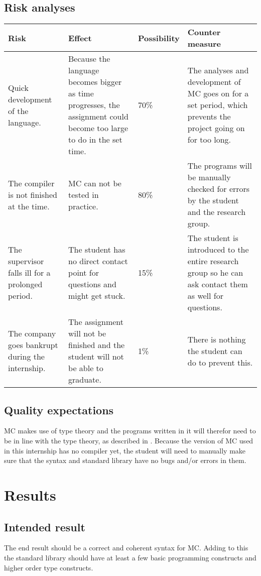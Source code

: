 \subsection{Risk analyses}
\begin{center}
   \begin{tabular}
      {| p{} | p{} | l | p{} |}
      \hline
      \textbf{Risk} & \textbf{Effect} & \textbf{Possibility} & \textbf{Counter measure}
      \\ \hline
      Quick development of the language. & Because the language becomes bigger as time progresses, the assignment could become too large to do in the set time. & 70\% & The analyses and development of MC goes on for a set period, which prevents the project going on for too long.
      \\ \hline
      The compiler is not finished at the time. & MC can not be tested in practice. & 80\% & The programs will be manually checked for errors by the student and the research group.
      \\ \hline
      The supervisor falls ill for a prolonged period. & The student has no direct contact point for questions and might get stuck. & 15\% & The student is introduced to the entire research group so he can ask contact them as well for questions.
      \\ \hline
      The company goes bankrupt during the internship. & The assignment will not be finished and the student will not be able to graduate. & 1\% & There is nothing the student can do to prevent this.
      \\ \hline
   \end{tabular}
\end{center}

\subsection{Quality expectations}
MC makes use of type theory and the programs written in it will therefor need to be in line with the type theory, as described in \cite{pierce2002types}.
Because the version of MC used in this internship has no compiler yet, the student will need to manually make sure that the syntax and standard library have no bugs and/or errors in them.

\section{Results}
\subsection{Intended result}
The end result should be a correct and coherent syntax for MC.
Adding to this the standard library should have at least a few basic programming constructs and higher order type constructs.





\begin{appendices}
   
\end{appendices}

